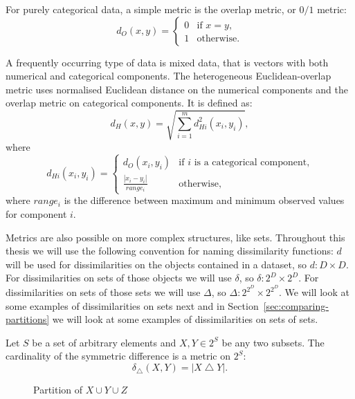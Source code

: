 \documentclass[a4paper]{report}
\DeclareMathOperator{\symdif}{\bigtriangleup}
\newcommand{\dset}{D}
\newcommand{\psettimes}{\! \times}
\newcommand{\pspsettimes}{\! \! \times}
\begin{document}
For purely categorical data, a simple metric is the overlap metric, or $0/1$
metric:
\begin{equation*}
  d_O(x,y) =
  \begin{cases}
    0 & \text{if $x=y$,} \\
    1 & \text{otherwise.}
  \end{cases}
\end{equation*}

A frequently occurring type of data is mixed data, that is vectors with both
numerical and categorical components.  The heterogeneous Euclidean-overlap
metric uses normalised Euclidean distance on the numerical components and the
overlap metric on categorical components.  It is defined as:
\begin{equation*}
  d_{H}(x,y) = \sqrt{\sum_{i=1}^{m} d_{Hi}^2(x_i,y_i)},
\end{equation*}
where
\begin{equation*}
  d_{Hi}(x_i,y_i) =
  \begin{cases}
    d_O(x_i,y_i) & \text{if $i$ is a categorical component,} \\
    \displaystyle \frac{|x_i-y_i|}{range_i} & \text{otherwise,}
  \end{cases}
\end{equation*}
where $range_i$ is the difference between maximum and minimum observed values
for component $i$.

Metrics are also possible on more complex structures, like sets.  Throughout
this thesis we will use the following convention for naming dissimilarity
functions: $d$ will be used for dissimilarities on the objects contained in a
dataset, so $d \colon \dset \times \dset$.  For dissimilarities on sets of
those objects we will use $\delta$, so $\delta \colon 2^{\dset} \psettimes
2^{\dset}$.  For dissimilarities on sets of those sets we will use $\Delta$,
so $\Delta \colon 2^{2^{\dset}} \pspsettimes 2^{2^{\dset}}$.  We will look at
some examples of dissimilarities on sets next and in
Section~\ref{sec:comparing-partitions} we will look at some examples of
dissimilarities on sets of sets.

Let $S$ be a set of arbitrary elements and $X,Y \in 2^{S}$ be any two subsets.
The cardinality of the symmetric difference is a metric on $2^{S}$:
\begin{equation*}
  \delta_{\symdif}(X,Y) = |X \symdif Y|.
\end{equation*}

\begin{figure}
  \centering
  \caption{Partition of $X \cup Y \cup Z$}
  \label{fig:partition}
\end{figure}
\end{document}
